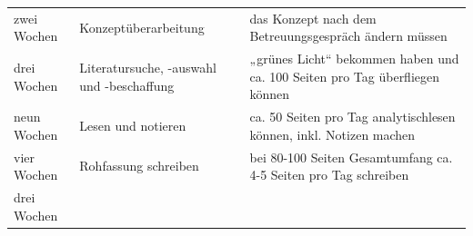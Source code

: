 \documentclass[]{book}
\theoremstyle{definition}
\theoremstyle{definition}
\theoremstyle{definition}
\theoremstyle{remark}
\begin{document}
\begin{longtable}[]{@{}lll@{}}
\begin{minipage}[t]{0.16\columnwidth}
zwei Wochen\strut
\end{minipage} & \begin{minipage}[t]{0.35\columnwidth}\raggedright\strut
Konzeptüberarbeitung\strut
\end{minipage} & \begin{minipage}[t]{0.41\columnwidth}\raggedright\strut
das Konzept nach dem Betreuungsgespräch ändern müssen\vspace{5mm}\strut
\end{minipage}\tabularnewline
\begin{minipage}[t]{0.16\columnwidth}\raggedright\strut
drei Wochen\strut
\end{minipage} & \begin{minipage}[t]{0.35\columnwidth}\raggedright\strut
Literatursuche, -auswahl und -beschaffung\strut
\end{minipage} & \begin{minipage}[t]{0.41\columnwidth}\raggedright\strut
„grünes Licht`` bekommen haben und ca. 100 Seiten pro Tag überfliegen
können\vspace{5mm}\strut
\end{minipage}\tabularnewline
\begin{minipage}[t]{0.16\columnwidth}\raggedright\strut
neun Wochen\strut
\end{minipage} & \begin{minipage}[t]{0.35\columnwidth}\raggedright\strut
Lesen und notieren\strut
\end{minipage} & \begin{minipage}[t]{0.41\columnwidth}\raggedright\strut
ca. 50 Seiten pro Tag analytischlesen können, inkl. Notizen
machen\vspace{5mm}\strut
\end{minipage}\tabularnewline
\begin{minipage}[t]{0.16\columnwidth}\raggedright\strut
vier Wochen\strut
\end{minipage} & \begin{minipage}[t]{0.35\columnwidth}\raggedright\strut
Rohfassung schreiben\strut
\end{minipage} & \begin{minipage}[t]{0.41\columnwidth}\raggedright\strut
bei 80-100 Seiten Gesamtumfang ca. 4-5 Seiten pro Tag
schreiben\vspace{5mm}\strut
\end{minipage}\tabularnewline
\begin{minipage}[t]{0.16\columnwidth}\raggedright\strut
drei Wochen\strut
\end{minipage} & \begin{minipage}[t]{0.35\columnwidth}\raggedright\strut

\end{minipage}
\end{longtable}
\end{document}

